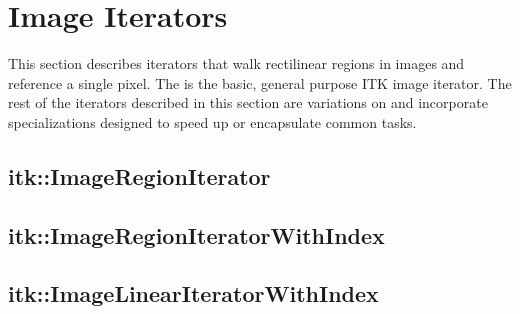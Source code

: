 



\section{Image Iterators}
\label{sec:ImageIterators}
This section describes iterators that walk rectilinear regions in images and
reference a single pixel.  The  is the basic,
general purpose ITK image iterator.  The rest of the iterators described in
this section are variations on  and
incorporate specializations designed to speed up or encapsulate common tasks.


\subsection{itk::ImageRegionIterator}
\label{sec:itkImageRegionIterator}


\subsection{itk::ImageRegionIteratorWithIndex}
\label{sec:itkImageRegionIteratorWithIndex}


\subsection{itk::ImageLinearIteratorWithIndex}
\label{sec:itkImageLinearIteratorWithIndex}


